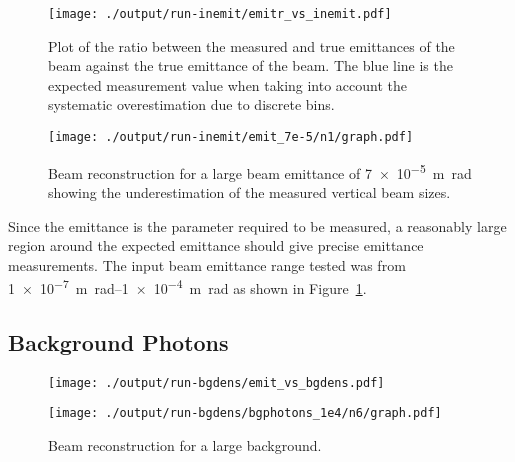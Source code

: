 \begin{figure}[!tb]
	\centering
	\texttt{[image: ./output/run-inemit/emitr\_vs\_inemit.pdf]}
	\caption{
		Plot of the ratio between the measured and true emittances of the beam
		against the true emittance of the beam.
		The blue line is the expected measurement value when taking into account
		the systematic overestimation due to discrete bins.
	}
	\label{fig:emitr_inemit}
\end{figure}


\begin{figure}[!tb]
	\centering
	\texttt{[image: ./output/run-inemit/emit\_7e-5/n1/graph.pdf]}
	\caption{
		Beam reconstruction for a large beam emittance of \SI{7e-5}{\meter\radian}
		showing the underestimation of the measured vertical beam sizes.
	}
	\label{fig:large_emit}
\end{figure}

Since the emittance is the parameter required to be measured, a reasonably large
region around the expected emittance should give precise emittance measurements.
The input beam emittance range tested was from \SIrange{1e-7}{1e-4}%
{\meter\radian} as shown in Figure~\ref{fig:emitr_inemit}.

\subsection{Background Photons}


\begin{figure}[!t]
	\centering
	\texttt{[image: ./output/run-bgdens/emit\_vs\_bgdens.pdf]}
	\caption{
	}
	\label{fig:emit_bgdens}
\end{figure}


\begin{figure}[!tb]
	\centering
	\texttt{[image: ./output/run-bgdens/bgphotons\_1e4/n6/graph.pdf]}
	\caption{
		Beam reconstruction for a large background.
	}
	\label{fig:large_bg}
\end{figure}



